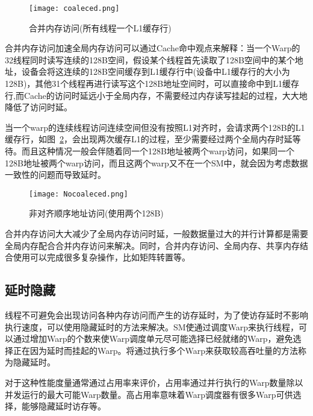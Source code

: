 \begin{figure}[H] %
	\centering
	\texttt{[image: coaleced.png]}
	\caption{合并内存访问(所有线程一个L1缓存行)}
	\label{fig:coalesced}
\end{figure}
合并内存访问加速全局内存访问可以通过Cache命中观点来解释：当一个Warp的32线程同时读写连续的128B空间，假设某个线程首先读取了128B空间中的某个地址，设备会将这连续的128B空间缓存到L1缓存行中(设备中L1缓存行的大小为128B)，其他31个线程再进行读写这个128B地址空间时，可以直接命中到L1缓存行,而Cache的访问时延远小于全局内存，不需要经过内存读写挂起的过程，大大地降低了访问时延。

当一个warp的连续线程访问连续空间但没有按照L1对齐时，会请求两个128B的L1缓存行，如图~\ref{fig:Nocoaleced}，会出现两次缓存L1的过程，至少需要经过两个全局内存时延等待。而且这种情况一般会伴随着同一个128B地址被两个warp访问，如果同一个128B地址被两个warp访问，而且这两个warp又不在一个SM中，就会因为考虑数据一致性的问题而导致延时。

\begin{figure}[H] %
	\centering
	\texttt{[image: Nocoaleced.png]}
	\caption{非对齐顺序地址访问(使用两个128B)}
	\label{fig:Nocoaleced}
\end{figure}

合并内存访问大大减少了全局内存访问时延，一般数据量过大的并行计算都是需要全局内存配合合并内存访问来解决。同时，合并内存访问、全局内存、共享内存结合使用可以完成很多复杂操作，比如矩阵转置等。


\subsection{延时隐藏}

线程不可避免会出现访问各种内存访问而产生的访存延时，为了使访存延时不影响执行速度，可以使用隐藏延时的方法来解决。SM使通过调度Warp来执行线程，可以通过增加Warp的个数来使Warp调度单元尽可能选择已经就绪的Warp，避免选择正在因为延时而挂起的Warp。将通过执行多个Warp来获取较高吞吐量的方法称为隐藏延时。

对于这种性能度量通常通过占用率来评价，占用率通过并行执行的Warp数量除以并发运行的最大可能Warp数量。高占用率意味着Warp调度器有很多Warp可供选择，能够隐藏延时访存等。

